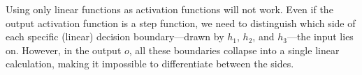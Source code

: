 \begin{answer}
    Using only linear functions as activation functions will not work. Even if the output activation function is a step function, we need to distinguish which side of each specific (linear) decision boundary---drawn by $h_1$, $h_2$, and $h_3$---the input lies on. However, in the output $o$, all these boundaries collapse into a single linear calculation, making it impossible to differentiate between the sides.

\end{answer}
